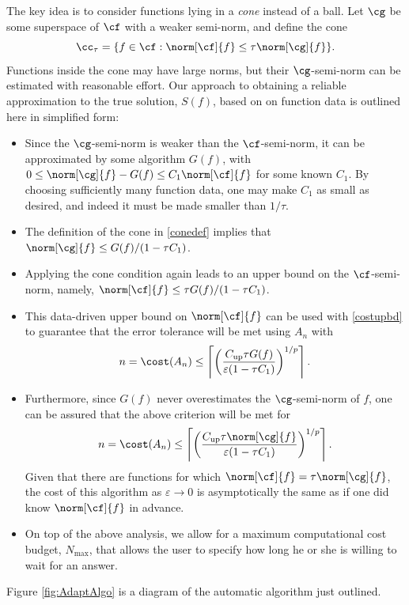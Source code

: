 \documentclass[]{elsarticle}
\DeclareMathOperator{\up}{up}
\theoremstyle{definition}
\theoremstyle{remark}
\begin{document}
The key idea is to consider functions lying in a \emph{cone} instead of a ball.  Let $\cg$ be some superspace of $\cf$ with a weaker semi-norm, and define the cone
\begin{equation} \label{conedef}
\cc_{\tau}=\{f \in \cf : \norm[\cf]{f} \le \tau \norm[\cg]{f} \}.
\end{equation}
Functions inside the cone may have large norms, but their $\cg$-semi-norm can be estimated with reasonable effort.  Our approach to obtaining a reliable approximation to the true solution, $S(f)$, based on on function data is outlined here in simplified form:
\begin{itemize}
\item Since the $\cg$-semi-norm is weaker than the $\cf$-semi-norm, it can be approximated by some algorithm $G(f)$, with $0\le \norm[\cg]{f}-G(f) \le C_1\norm[\cf]{f}$ for some known $C_1$.  By choosing sufficiently many function data, one may make $C_1$ as small as desired, and indeed it must be made smaller than $1/\tau$.

\item The definition of the cone in \eqref{conedef} implies that $\norm[\cg]{f} \le G(f)/(1 - \tau C_1)$.

\item Applying the cone condition again leads to an upper bound on the $\cf$-semi-norm, namely,  $\norm[\cf]{f} \le \tau G(f)/(1 - \tau C_1)$.

\item This data-driven upper bound on $\norm[\cf]{f}$ can be used with \eqref{costupbd} to guarantee that the error tolerance will be met using $A_n$ with
\[
n=\cost(A_n)\le \left \lceil\left(\frac{ C_{\up}\tau G(f)}{\varepsilon(1 - \tau C_1)}\right)^{1/p} \right \rceil.
\]

\item Furthermore, since $G(f)$ never overestimates the $\cg$-semi-norm of $f$, one can be assured that the above criterion will be met for 
\[
n=\cost(A_n)\le \left \lceil\left(\frac{ C_{\up}\tau \norm[\cg]{f}}{\varepsilon(1 - \tau C_1)}\right)^{1/p} \right \rceil.
\]
Given that there are functions for which $\norm[\cf]{f} = \tau \norm[\cg]{f}$, the cost of this algorithm as $\varepsilon \to 0$ is asymptotically the same as if one did know $\norm[\cf]{f}$ in advance.

\item On top of the above analysis, we allow for a maximum computational cost budget, $N_{\max}$, that allows the user to specify how long he or she is willing to wait for an answer.

\end{itemize} 
Figure \ref{fig:AdaptAlgo} is a diagram of the automatic algorithm just outlined.
\end{document}
